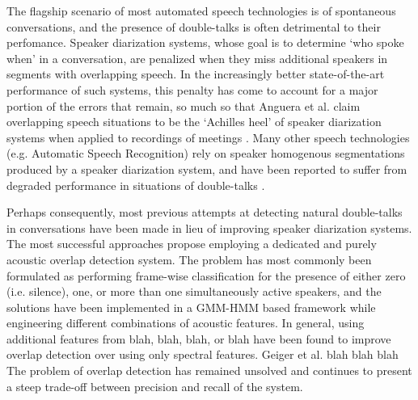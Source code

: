 \documentclass[a4paper]{article}
\begin{document}
The flagship scenario of most automated speech technologies is of spontaneous conversations,
and the presence of double-talks is often detrimental to their perfomance.
Speaker diarization systems, whose goal is to determine `who spoke when' in a conversation,
are penalized when they miss additional speakers in segments with overlapping speech.
In the increasingly better state-of-the-art performance of such systems,
this penalty has come to account for a major portion of the errors that remain,
so much so that Anguera et al. claim overlapping speech situations to be the `Achilles heel' of speaker diarization systems when applied to recordings of meetings \cite{anguera_speaker_2012}.
Many other speech technologies (e.g. Automatic Speech Recognition) rely on speaker homogenous segmentations produced by a speaker diarization system,
and have been reported to suffer from degraded performance in situations of double-talks \cite{cetin_speaker_2006}.

Perhaps consequently, most previous attempts at detecting natural double-talks in conversations have been made in lieu of improving speaker diarization systems.
The most successful approaches propose employing a dedicated and purely acoustic overlap detection system.
The problem has most commonly been formulated as performing frame-wise classification for the presence of either
zero (i.e. silence), one, or more than one simultaneously active speakers,
and the solutions have been implemented in a GMM-HMM based framework while engineering different combinations of acoustic features.  %
In general, using additional features from blah, blah, blah, or blah %
have been found to improve overlap detection over using only spectral features.
Geiger et al. blah blah blah  %
The problem of overlap detection has remained unsolved
and continues to present a steep trade-off between precision and recall of the system.
\end{document}
